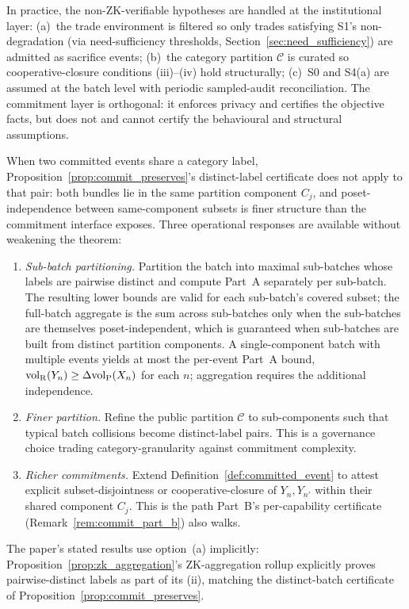 \begin{remark}
\label{rem:external_attestation}
In practice, the non-ZK-verifiable hypotheses are handled at the
institutional layer: (a)~the trade environment is filtered so
only trades satisfying S1's non-degradation (via
need-sufficiency thresholds, Section~\ref{sec:need_sufficiency})
are admitted as sacrifice events; (b)~the category partition
$\mathcal{C}$ is curated so cooperative-closure conditions
(iii)--(iv) hold structurally; (c)~S0 and S4(a) are assumed at
the batch level with periodic sampled-audit reconciliation.  The
commitment layer is orthogonal: it enforces privacy and
certifies the objective facts, but does not and cannot certify
the behavioural and structural assumptions.
\end{remark}

\begin{remark}
\label{rem:label_collision}
When two committed events share a category label,
Proposition~\ref{prop:commit_preserves}'s distinct-label
certificate does not apply to that pair: both bundles lie in
the same partition component $C_j$, and poset-independence
between same-component subsets is finer structure than the
commitment interface exposes.  Three operational responses are
available without weakening the theorem:
\begin{enumerate}
\item[(a)] \emph{Sub-batch partitioning.} Partition the batch
  into maximal sub-batches whose labels are pairwise distinct
  and compute Part~A separately per sub-batch.  The resulting
  lower bounds are valid for each sub-batch's covered subset;
  the full-batch aggregate is the sum across sub-batches only
  when the sub-batches are themselves poset-independent, which
  is guaranteed when sub-batches are built from distinct
  partition components.  A single-component batch with multiple
  events yields at most the per-event Part~A bound,
  ${\operatorname{vol}_{\mathrm{R}}}(Y_n) \geq \Delta{\operatorname{vol}_{\mathrm{P}}}(X_n)$ for each $n$; aggregation
  requires the additional independence.
\item[(b)] \emph{Finer partition.}  Refine the public partition
  $\mathcal{C}$ to sub-components such that typical batch
  collisions become distinct-label pairs.  This is a governance
  choice trading category-granularity against commitment
  complexity.
\item[(c)] \emph{Richer commitments.}  Extend
  Definition~\ref{def:committed_event} to attest explicit
  subset-disjointness or cooperative-closure of $Y_n, Y_{n'}$
  within their shared component $C_j$.  This is the path
  Part~B's per-capability certificate (Remark~\ref{rem:commit_part_b})
  also walks.
\end{enumerate}
The paper's stated results use option~(a) implicitly:
Proposition~\ref{prop:zk_aggregation}'s ZK-aggregation rollup
explicitly proves pairwise-distinct labels as part of its
(ii), matching the distinct-batch certificate of
Proposition~\ref{prop:commit_preserves}.
\end{remark}

